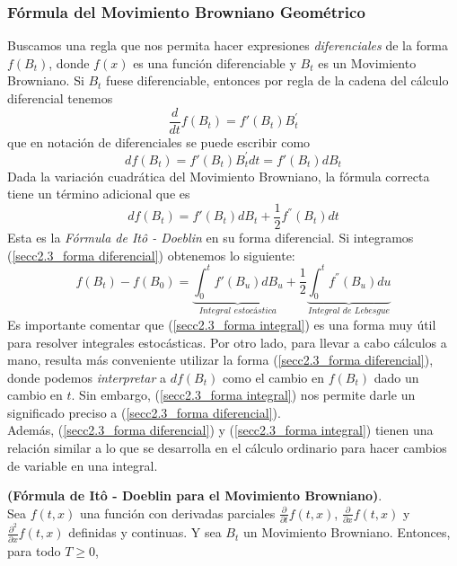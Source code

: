 \documentclass[11pt,notitlepage]{article}
\begin{document}
\subsubsection{Fórmula del Movimiento Browniano Geométrico}
Buscamos una regla que nos permita hacer expresiones \textit{diferenciales} de la forma $f(B_{t})$, donde $f(x)$ es una función diferenciable y $B_{t}$ es un Movimiento Browniano. Si $B_{t}$ fuese diferenciable, entonces por regla de la cadena del cálculo diferencial tenemos
\begin{equation*}
    \frac{d}{dt}f(B_{t})=f'(B_{t}) B_{t}^{'}
\end{equation*}
que en notación de diferenciales se puede escribir como
\begin{equation*}
    df(B_{t})=f'(B_{t})B_{t}^{'}dt=f'(B_{t})dB_{t}
\end{equation*}
Dada la variación cuadrática del Movimiento Browniano, la fórmula correcta tiene un término adicional que es 
\begin{equation}\label{secc2.3_forma diferencial}
    df(B_{t})=f'(B_{t})dB_{t}+\frac{1}{2}f^{''}(B_{t})dt
\end{equation}
Esta es la \textit{Fórmula de Itô - Doeblin} en su forma diferencial. Si integramos (\ref{secc2.3_forma diferencial}) obtenemos lo siguiente:
\begin{equation}\label{secc2.3_forma integral}
    f(B_{t})-f(B_{0})=\underbrace{\int_{0}^{t}f'(B_{u})dB_{u}}_{\textit{Integral estocástica}}+\frac{1}{2}\underbrace{\int_{0}^{t}f^{''}(B_{u})du}_{\textit{Integral de Lebesgue}}
\end{equation}
Es importante comentar que (\ref{secc2.3_forma integral}) es una forma muy útil para resolver integrales estocásticas. Por otro lado, para llevar a cabo cálculos a mano, resulta más conveniente utilizar la forma (\ref{secc2.3_forma diferencial}), donde podemos \textit{interpretar} a $df(B_{t})$ como el cambio en $f(B_{t})$ dado un cambio  en \(t\). Sin embargo, (\ref{secc2.3_forma integral}) nos permite darle un significado preciso a (\ref{secc2.3_forma diferencial}).\\

Además, (\ref{secc2.3_forma diferencial}) y (\ref{secc2.3_forma integral}) tienen una relación similar a lo que se desarrolla en el cálculo ordinario para hacer cambios de variable en una integral.\\

\begin{teor}
\textbf{\label{secc2.3_teo1}}\textbf{ (Fórmula de Itô - Doeblin para el Movimiento Browniano)}.\\
Sea $f(t,x)$ una función con derivadas parciales $\frac{\partial }{\partial t}f(t,x)$, $\frac{\partial }{\partial x}f(t,x)$ y $\frac{\partial^{2}}{\partial x}f(t,x)$ definidas y continuas. Y sea $B_{t}$ un Movimiento Browniano. Entonces, para todo $T\geq0$,
\end{teor}
\end{document}
